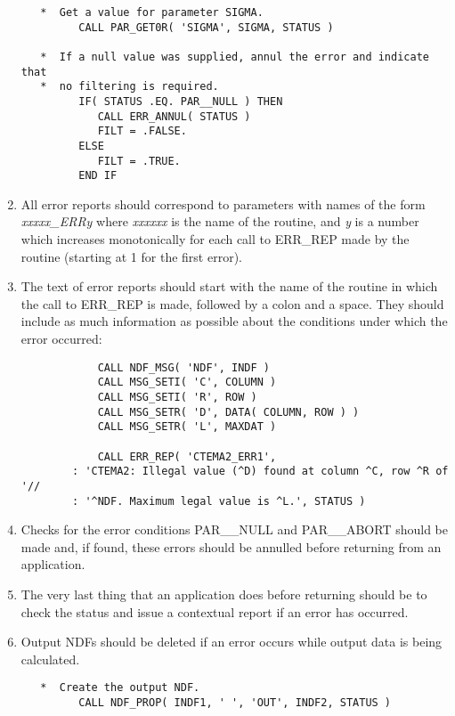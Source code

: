 \begin{enumerate}
\begin{verbatim}
   *  Get a value for parameter SIGMA.
         CALL PAR_GET0R( 'SIGMA', SIGMA, STATUS )

   *  If a null value was supplied, annul the error and indicate that
   *  no filtering is required.
         IF( STATUS .EQ. PAR__NULL ) THEN
            CALL ERR_ANNUL( STATUS )
            FILT = .FALSE.
         ELSE
            FILT = .TRUE.
         END IF
\end{verbatim}
\normalsize

\item All error reports should correspond to parameters with names of the form
{\em xxxxx\_ERRy} where {\em xxxxxx} is the name of the routine, and {\em y} is
a number which increases monotonically for each call to {\small ERR\_REP} made
by the routine (starting at 1 for the first error). 

\item The text of error reports should start with the name of the routine in 
which the call to {\small ERR\_REP} is made, followed by a colon and a space. 
They should include as much information as possible about the conditions under 
which the error occurred:

\small
\begin{verbatim}
            CALL NDF_MSG( 'NDF', INDF )
            CALL MSG_SETI( 'C', COLUMN )
            CALL MSG_SETI( 'R', ROW )
            CALL MSG_SETR( 'D', DATA( COLUMN, ROW ) )
            CALL MSG_SETR( 'L', MAXDAT )

            CALL ERR_REP( 'CTEMA2_ERR1', 
        : 'CTEMA2: Illegal value (^D) found at column ^C, row ^R of '//
        : '^NDF. Maximum legal value is ^L.', STATUS )
\end{verbatim}
\normalsize

\item Checks for the error conditions {\small PAR\_\_NULL} and {\small
PAR\_\_ABORT} should be made and, if found, these errors should be annulled
before returning from an application. 

\item The very last thing that an application does before returning should be to
check the status and issue a contextual report if an error has occurred. 

\item Output {\small NDF}s should be deleted if an error occurs while output 
data is being calculated.

\small
\begin{verbatim}
   *  Create the output NDF.
         CALL NDF_PROP( INDF1, ' ', 'OUT', INDF2, STATUS )


\end{verbatim}
\end{enumerate}
